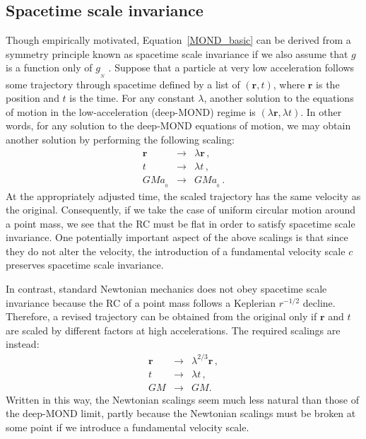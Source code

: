 \documentclass[fleqn,usenatbib,useAMS]{mnras} %
\begin{document}
\subsection{Spacetime scale invariance}
\label{Spacetime_scale_invariance}

Though empirically motivated, Equation~\ref{MOND_basic} can be derived from a symmetry principle known as spacetime scale invariance if we also assume that $g$ is a function only of $g_{_N}$ \citep{Milgrom_2009_DML}. Suppose that a particle at very low acceleration follows some trajectory through spacetime defined by a list of $\left( \bm{r}, t \right)$, where $\bm{r}$ is the position and $t$ is the time. For any constant $\lambda$, another solution to the equations of motion in the low-acceleration (deep-MOND) regime is $ \left( \lambda \bm{r}, \lambda t \right)$. In other words, for any solution to the deep-MOND equations of motion, we may obtain another solution by performing the following scaling:
\begin{eqnarray}
	\bm{r} &\to& \lambda \bm{r} \, , \\
	t &\to& \lambda t \, , \\
	GMa_{_0} &\to& GMa_{_0} \, .
	\label{Scale_invariance_scalings}
\end{eqnarray}
At the appropriately adjusted time, the scaled trajectory has the same velocity as the original. Consequently, if we take the case of uniform circular motion around a point mass, we see that the RC must be flat in order to satisfy spacetime scale invariance. One potentially important aspect of the above scalings is that since they do not alter the velocity, the introduction of a fundamental velocity scale $c$ preserves spacetime scale invariance.

In contrast, standard Newtonian mechanics does not obey spacetime scale invariance because the RC of a point mass follows a Keplerian $r^{-1/2}$ decline. Therefore, a revised trajectory can be obtained from the original only if $\bm{r}$ and $t$ are scaled by different factors at high accelerations. The required scalings are instead:
\begin{eqnarray}
	\bm{r} &\to& \lambda^{2/3} \bm{r} \, , \\
	t &\to& \lambda t \, , \\
	GM &\to& GM.
	\label{Newtonian_scalings}
\end{eqnarray}
Written in this way, the Newtonian scalings seem much less natural than those of the deep-MOND limit, partly because the Newtonian scalings must be broken at some point if we introduce a fundamental velocity scale.
\end{document}
